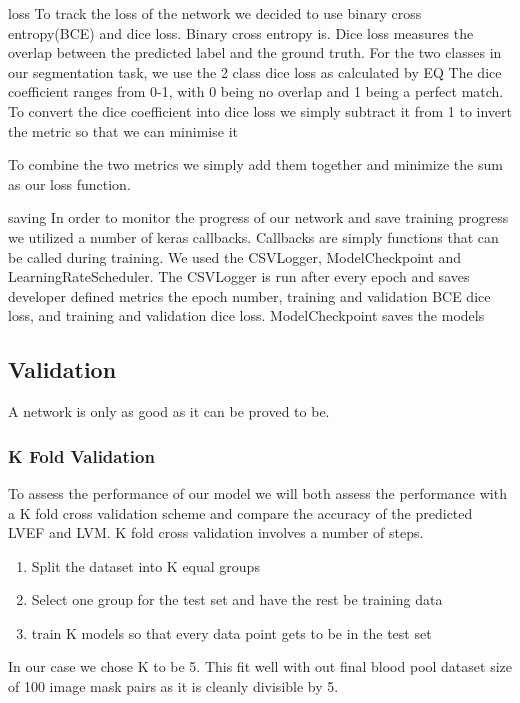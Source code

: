 \documentclass[12pt]{article}
\begin{document}
loss
To track the loss of the network we decided to use binary cross entropy(BCE) and dice loss.
Binary cross entropy is. %
Dice loss measures the overlap between the predicted label and the ground truth.
For the two classes in our segmentation task, we use the 2 class dice loss as calculated by EQ %
The dice coefficient ranges from 0-1, with 0 being no overlap and 1 being a perfect match.
To convert the dice coefficient into dice loss we simply subtract it from 1 to invert the metric so that we can minimise it

To combine the two metrics we simply add them together and minimize the sum as our loss function.

saving
In order to monitor the progress of our network and save training progress we utilized a number of keras callbacks.
Callbacks are simply functions that can be called during training.
We used the CSVLogger, ModelCheckpoint and LearningRateScheduler.
The CSVLogger is run after every epoch and saves developer defined metrics the epoch number, training and validation BCE dice loss, and training and validation dice loss.
ModelCheckpoint saves the models


\subsection{Validation}
A network is only as good as it can be proved to be.
\subsubsection{K Fold Validation}
To assess the performance of our model we will both assess the performance with a K fold cross validation scheme and compare the accuracy of the predicted LVEF and LVM.
K fold cross validation involves a number of steps.

\begin{enumerate}
	\item{Split the dataset into K equal groups}
	\item{Select one group for the test set and have the rest be training data}
	\item{train K models so that every data point gets to be in the test set}
\end{enumerate}

In our case we chose K to be 5.
This fit well with out final blood pool dataset size of 100 image mask pairs as it is cleanly divisible by 5.
\end{document}
